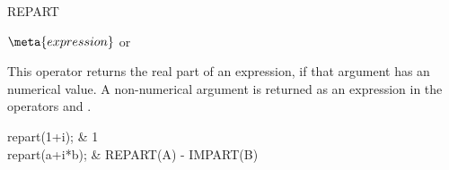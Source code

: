 \begin{Operator}{REPART}
\begin{Syntax}
\(\meta{expression}\) or  
\end{Syntax}

This operator returns the real part of an expression, if that argument has an
numerical value.  A non-numerical argument is returned as an expression in
the operators  and .
\begin{Examples}
repart(1+i);   & 1 \\
repart(a+i*b); & REPART(A) - IMPART(B)
\end{Examples}

\end{Operator}


